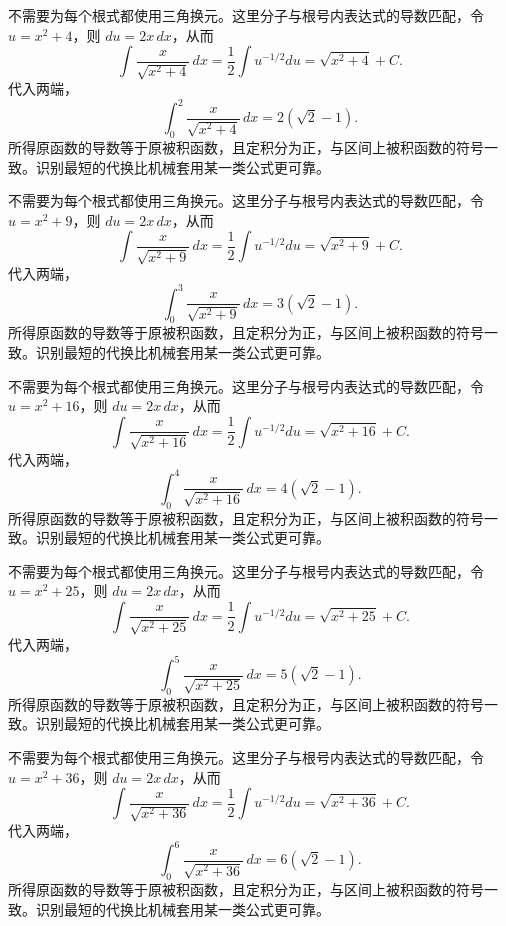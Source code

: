 \documentclass[UTF8,12pt,a4paper,fontset=fandol]{ctexart}
\begin{document}
\begin{solve}\label{ans:c14q20}
不需要为每个根式都使用三角换元。这里分子与根号内表达式的导数匹配，令 $u=x^2+4$，则 $du=2x\,dx$，从而
\[
\int\frac{x}{\sqrt{x^2+4}}\,dx=\frac12\int u^{-1/2}du=\sqrt{x^2+4}+C.
\]
代入两端，
\[
\int_0^{2}\frac{x}{\sqrt{x^2+4}}\,dx=2(\sqrt2-1).
\]
所得原函数的导数等于原被积函数，且定积分为正，与区间上被积函数的符号一致。识别最短的代换比机械套用某一类公式更可靠。
\end{solve}

\begin{solve}\label{ans:c14q21}
不需要为每个根式都使用三角换元。这里分子与根号内表达式的导数匹配，令 $u=x^2+9$，则 $du=2x\,dx$，从而
\[
\int\frac{x}{\sqrt{x^2+9}}\,dx=\frac12\int u^{-1/2}du=\sqrt{x^2+9}+C.
\]
代入两端，
\[
\int_0^{3}\frac{x}{\sqrt{x^2+9}}\,dx=3(\sqrt2-1).
\]
所得原函数的导数等于原被积函数，且定积分为正，与区间上被积函数的符号一致。识别最短的代换比机械套用某一类公式更可靠。
\end{solve}

\begin{solve}\label{ans:c14q22}
不需要为每个根式都使用三角换元。这里分子与根号内表达式的导数匹配，令 $u=x^2+16$，则 $du=2x\,dx$，从而
\[
\int\frac{x}{\sqrt{x^2+16}}\,dx=\frac12\int u^{-1/2}du=\sqrt{x^2+16}+C.
\]
代入两端，
\[
\int_0^{4}\frac{x}{\sqrt{x^2+16}}\,dx=4(\sqrt2-1).
\]
所得原函数的导数等于原被积函数，且定积分为正，与区间上被积函数的符号一致。识别最短的代换比机械套用某一类公式更可靠。
\end{solve}

\begin{solve}\label{ans:c14q23}
不需要为每个根式都使用三角换元。这里分子与根号内表达式的导数匹配，令 $u=x^2+25$，则 $du=2x\,dx$，从而
\[
\int\frac{x}{\sqrt{x^2+25}}\,dx=\frac12\int u^{-1/2}du=\sqrt{x^2+25}+C.
\]
代入两端，
\[
\int_0^{5}\frac{x}{\sqrt{x^2+25}}\,dx=5(\sqrt2-1).
\]
所得原函数的导数等于原被积函数，且定积分为正，与区间上被积函数的符号一致。识别最短的代换比机械套用某一类公式更可靠。
\end{solve}

\begin{solve}\label{ans:c14q24}
不需要为每个根式都使用三角换元。这里分子与根号内表达式的导数匹配，令 $u=x^2+36$，则 $du=2x\,dx$，从而
\[
\int\frac{x}{\sqrt{x^2+36}}\,dx=\frac12\int u^{-1/2}du=\sqrt{x^2+36}+C.
\]
代入两端，
\[
\int_0^{6}\frac{x}{\sqrt{x^2+36}}\,dx=6(\sqrt2-1).
\]
所得原函数的导数等于原被积函数，且定积分为正，与区间上被积函数的符号一致。识别最短的代换比机械套用某一类公式更可靠。
\end{solve}
\end{document}
